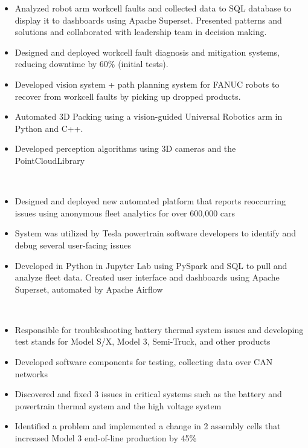     \begin{itemize}
        \item Analyzed robot arm workcell faults and collected data to SQL database to display it to dashboards using Apache Superset. Presented patterns and solutions and collaborated with leadership team in decision making.
        \item Designed and deployed workcell fault diagnosis and mitigation systems, reducing downtime by 60\% (initial tests).
        \item Developed vision system + path planning system for FANUC robots to recover from workcell faults by picking up dropped products.
    \end{itemize}
\divider
{}
    \begin{itemize}
        \item Automated 3D Packing using a vision-guided Universal Robotics arm in Python and C++.
        \item Developed perception algorithms using 3D cameras and the PointCloudLibrary
    \end{itemize}
\divider \\
    \begin{itemize}
        \item Designed and deployed new automated platform that reports reoccurring issues using anonymous fleet analytics for over 600,000 cars
        \item System was utilized by Tesla powertrain software developers to identify and debug several user-facing issues
        \item Developed in Python in Jupyter Lab using PySpark and SQL to pull and analyze fleet data. Created user interface and dashboards using Apache Superset, automated by Apache Airflow
    \end{itemize}
\divider \\
    \begin{itemize}
        \item Responsible for troubleshooting battery thermal system issues and developing test stands for Model S/X, Model 3, Semi-Truck, and other products
        \item Developed software components for testing, collecting data over CAN networks
        \item Discovered and fixed 3 issues in critical systems such as the battery and powertrain thermal system and the high voltage system
        \item Identified a problem and implemented a change in 2 assembly cells that increased Model 3 end-of-line production by 45\%
    \end{itemize}
